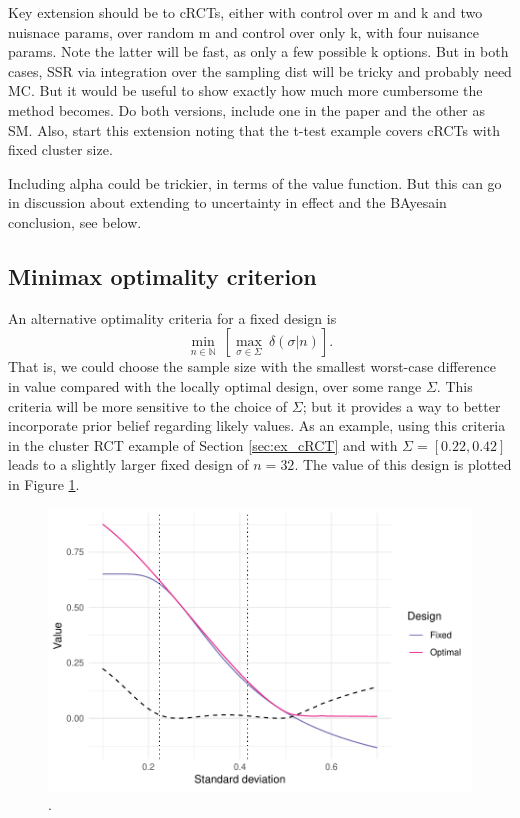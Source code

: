 \documentclass[sagev, Crown]{sagej}
\begin{document}
Key extension should be to cRCTs, either with control over m and k and two nuisnace params, over random m and control over only k, with four nuisance params. Note the latter will be fast, as only a few possible k options. But in both cases, SSR via integration over the sampling dist will be tricky and probably need MC. But it would be useful to show exactly how much more cumbersome the method becomes. Do both versions, include one in the paper and the other as SM. Also, start this extension noting that the t-test example covers cRCTs with fixed cluster size. 

Including alpha could be trickier, in terms of the value function. But this can go in discussion about extending to uncertainty in effect and the BAyesain conclusion, see below.

\subsection{Minimax optimality criterion}

An alternative optimality criteria for a fixed design is
$$
\min_{n \in \mathbb{N}} ~ \left[ \max_{\sigma \in \Sigma} ~  \delta(\sigma | n) \right].
$$
That is, we could choose the sample size with the smallest worst-case difference in value compared with the locally optimal design, over some range $\Sigma$. This criteria will be more sensitive to the choice of $\Sigma$; but it provides a way to better incorporate prior belief regarding likely values. As an example, using this criteria in the cluster RCT example of Section \ref{sec:ex_cRCT} and with $\Sigma = [0.22, 0.42]$ leads to a slightly larger fixed design of $n = 32$. The value of this design is plotted in Figure \ref{fig:minimax_t_test}.

\begin{figure}
\centering
\includegraphics[scale=0.8]{./figures/minimax_t_test}
\caption{.}
\label{fig:minimax_t_test}
\end{figure}
\end{document}
